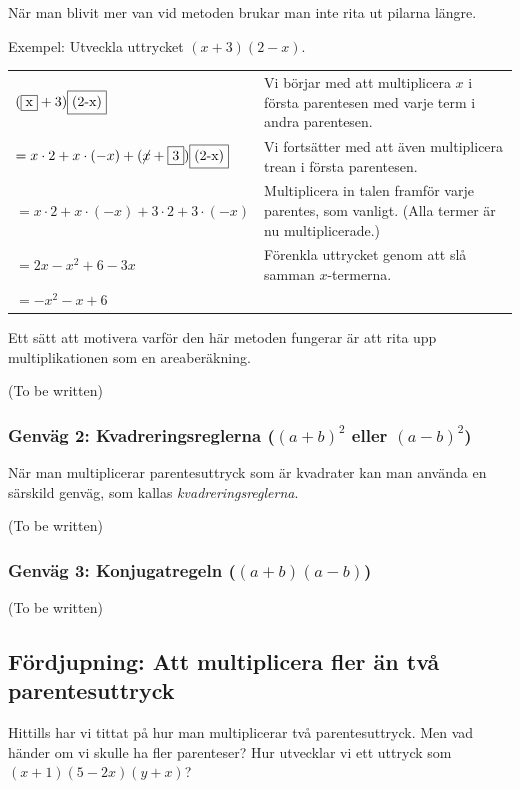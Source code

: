När man blivit mer van vid metoden brukar man inte rita ut pilarna längre.

Exempel: Utveckla uttrycket $(x+3)(2-x)$.

\smallskip
\begin{tabular}{l|p{5.7cm}}
  $(\framebox{x}+3)\framebox{(2-x)}$ & Vi börjar med att multiplicera $x$ i första parentesen med varje term i andra parentesen. \\
  $= x \cdot 2 + x \cdot (-x) + (\cancel{x} + \framebox{3})\framebox{(2-x)}$ &  Vi fortsätter med att även multiplicera trean i första parentesen. \\
  $= x \cdot 2 + x \cdot (-x) + 3 \cdot 2 + 3 \cdot (-x)$ & Multiplicera in talen framför varje parentes, som vanligt. (Alla termer är nu multiplicerade.) \\
  $= 2x - x^2 + 6 - 3x$ & Förenkla uttrycket genom att slå samman $x$-termerna. \\
  $=-x^2 - x + 6$ & \\
\end{tabular}
\smallskip

Ett sätt att motivera varför den här metoden fungerar är att rita upp multiplikationen som en areaberäkning.

(To be written)

\subsubsection{Genväg 2: Kvadreringsreglerna ($(a+b)^2$ eller $(a-b)^2$)}

När man multiplicerar parentesuttryck som är kvadrater kan man använda en särskild genväg, som kallas \emph{kvadreringsreglerna}.

(To be written)

\subsubsection{Genväg 3: Konjugatregeln ($(a+b)(a-b)$)}

(To be written)

\subsection{Fördjupning: Att multiplicera fler än två parentesuttryck}

Hittills har vi tittat på hur man multiplicerar två parentesuttryck.
Men vad händer om vi skulle ha fler parenteser?
Hur utvecklar vi ett uttryck som $(x+1)(5-2x)(y+x)$?

